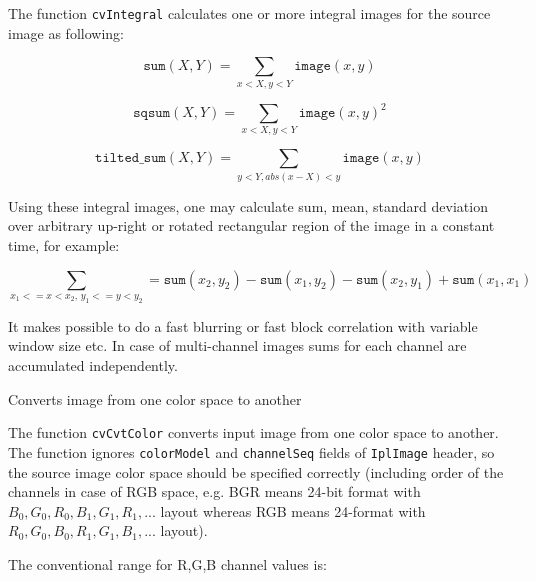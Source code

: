 The function \texttt{cvIntegral} calculates one or more integral images for the source image as following:

\[
\texttt{sum}(X,Y) = \sum_{x<X,y<Y} \texttt{image}(x,y)
\]

\[
\texttt{sqsum}(X,Y) = \sum_{x<X,y<Y} \texttt{image}(x,y)^2
\]

\[
\texttt{tilted\_sum}(X,Y) = \sum_{y<Y,abs(x-X)<y} \texttt{image}(x,y)
\]

Using these integral images, one may calculate sum, mean, standard deviation over arbitrary up-right or rotated rectangular region of the image in a constant time, for example:

\[
\sum_{x_1<=x<x_2, \, y_1<=y<y_2} = \texttt{sum}(x_2,y_2)-\texttt{sum}(x_1,y_2)-\texttt{sum}(x_2,y_1)+\texttt{sum}(x_1,x_1)
\]

It makes possible to do a fast blurring or fast block correlation with variable window size etc. In case of multi-channel images sums for each channel are accumulated independently.

\label{CvtColor}

Converts image from one color space to another


\begin{description}
\end{description}

The function \texttt{cvCvtColor} converts input image from one color
space to another. The function ignores \texttt{colorModel} and
\texttt{channelSeq} fields of \texttt{IplImage} header, so the
source image color space should be specified correctly (including
order of the channels in case of RGB space, e.g. BGR means 24-bit
format with $B_0, G_0, R_0, B_1, G_1, R_1, ...$ layout
whereas RGB means 24-format with $R_0, G_0, B_0, R_1, G_1, B_1, ...$
layout).

The conventional range for R,G,B channel values is:

